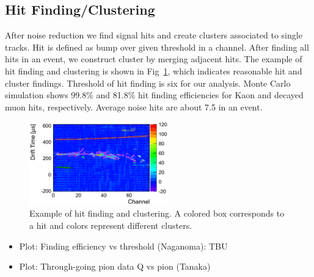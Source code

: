 \subsection{Hit Finding/Clustering}
After noise reduction we find signal hits and create clusters associated to single tracks. 
Hit is defined as bump over given threshold in a channel. 
After finding all hits in an event, we construct cluster by merging adjacent hits. 
The example of hit finding and clustering is shown in Fig~\ref{fig:Clustering}, which indicates reasonable hit and cluster findings. 
Threshold of hit finding is six for our analysis. Monte Carlo simulation shows 99.8\% and 81.8\% hit finding efficiencies for Kaon and decayed muon hits, respectively. 
Average noise hits are about 7.5 in an event.

\begin{figure}[htbp]
 \begin{center}
  \includegraphics[width=60mm]{fig/clustering.eps}
 \end{center}
 \caption{Example of hit finding and clustering. A colored box corresponds to a hit and colors represent different clusters.}
 \label{fig:Clustering}
\end{figure}

\begin{itemize}
\item Plot: Finding efficiency vs threshold (Naganoma): TBU
\item Plot: Through-going pion data Q vs pion (Tanaka)
\end{itemize}
